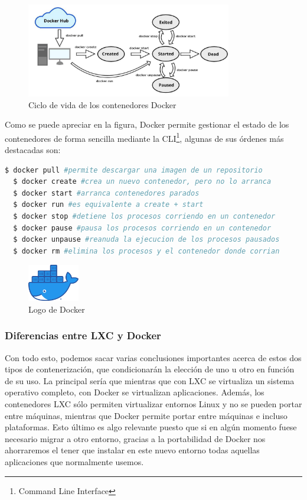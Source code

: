 \begin{figure}[h]
\centering
\includegraphics[width=0.8\textwidth]{../imgs/EdA/docker-life.jpeg}
\caption{Ciclo de vida de los contenedores Docker}
\label{fig:docker-life}
\end{figure}

Como se puede apreciar en la figura, Docker permite gestionar el estado de los contenedores de forma sencilla mediante la CLI\footnote{Command Line Interface}, algunas de sus órdenes más destacadas son:

\begin{lstlisting}[language=bash]
  $ docker pull #permite descargar una imagen de un repositorio
  $ docker create #crea un nuevo contenedor, pero no lo arranca 
  $ docker start #arranca contenedores parados
  $ docker run #es equivalente a create + start
  $ docker stop #detiene los procesos corriendo en un contenedor  
  $ docker pause #pausa los procesos corriendo en un contenedor
  $ docker unpause #reanuda la ejecucion de los procesos pausados
  $ docker rm #elimina los procesos y el contenedor donde corrian
\end{lstlisting}

\begin{figure}[h]
\centering
\includegraphics[width=0.2\textwidth]{../imgs/EdA/docker.png}
\caption{Logo de Docker}
\label{fig:docker-logo}
\end{figure}

\subsubsection{Diferencias entre LXC y Docker}
Con todo esto, podemos sacar varias conclusiones importantes acerca de estos dos tipos de contenerización, que condicionarán la elección de uno u otro en función de su uso. La principal sería que mientras que con LXC se virtualiza un sistema operativo completo, con Docker se virtualizan aplicaciones. Además, los contenedores LXC sólo permiten virtualizar entornos Linux y no se pueden portar entre máquinas, mientras que Docker permite portar entre máquinas e incluso plataformas. Esto último es algo relevante puesto que si en algún momento fuese necesario migrar a otro entorno, gracias a la portabilidad de Docker nos ahorraremos el tener que instalar en este nuevo entorno todas aquellas aplicaciones que normalmente usemos. 

